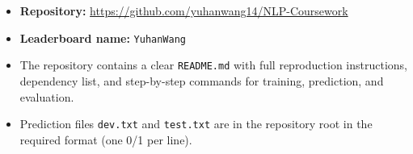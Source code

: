 \documentclass[11pt,a4paper]{article}
\begin{document}
\begin{itemize}[leftmargin=*]
    \item \textbf{Repository:} \url{https://github.com/yuhanwang14/NLP-Coursework}
    \item \textbf{Leaderboard name:} \texttt{YuhanWang}
    \item The repository contains a clear \texttt{README.md} with
          full reproduction instructions, dependency list, and
          step-by-step commands for training, prediction, and evaluation.
    \item Prediction files \texttt{dev.txt} and \texttt{test.txt} are in
          the repository root in the required format (one 0/1 per line).
\end{itemize}


\newpage


\end{document}
